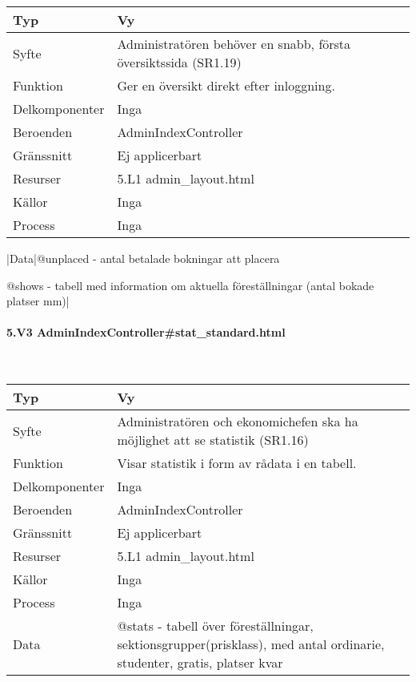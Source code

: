 \documentclass[a4paper, twoside, 11pt, titlepage]{article}
\begin{document}
			\begin {table} [ht] \begin{tabular} {  p{3.5cm} p{9.6cm} }
				\hline
				Typ & Vy  \\
				\hline
				Syfte & Administratören behöver en snabb, första översiktssida (SR1.19)  \\
				\hline
				Funktion & Ger en översikt direkt efter inloggning.  \\
				\hline
				Delkomponenter & Inga  \\
				\hline
				Beroenden & AdminIndexController  \\
				\hline
				Gränssnitt & Ej applicerbart  \\
				\hline
				Resurser & 5.L1 admin\_layout.html  \\
				\hline
				Källor & Inga  \\
				\hline
				Process & Inga  \\
				\hline
			\end{tabular} \end{table} \FloatBarrier
			\vspace{6mm}

			|Data|@unplaced - antal betalade bokningar att placera

			@shows - tabell med information om aktuella föreställningar (antal bokade platser mm)|

			\paragraph{5.V3 AdminIndexController\#stat\_standard.html}\

			\begin {table} [ht] \begin{tabular} {  p{3.5cm} p{9.6cm} }
				\hline
				Typ & Vy  \\
				\hline
				Syfte & Administratören och ekonomichefen ska ha möjlighet att se statistik (SR1.16)  \\
				\hline
				Funktion & Visar statistik i form av rådata i en tabell.  \\
				\hline
				Delkomponenter & Inga  \\
				\hline
				Beroenden & AdminIndexController  \\
				\hline
				Gränssnitt & Ej applicerbart  \\
				\hline
				Resurser & 5.L1 admin\_layout.html  \\
				\hline
				Källor & Inga  \\
				\hline
				Process & Inga  \\
				\hline
				Data & @stats - tabell över föreställningar, sektionsgrupper(prisklass), med antal ordinarie, studenter, gratis, platser kvar  \\
				\hline
			\end{tabular} \end{table} \FloatBarrier
\end{document}
